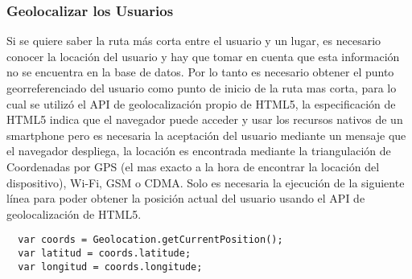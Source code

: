 

%
%
%



\subsubsection{Geolocalizar los Usuarios}
\label{sub:Manejo de Usuarios}

Si se quiere saber la ruta más corta entre el usuario y un lugar, es necesario conocer la locación del usuario y hay que tomar en cuenta que esta información no se encuentra en la base de datos. Por lo tanto es necesario obtener el punto georreferenciado del usuario como punto de inicio de la ruta mas corta, para lo cual se utilizó el API de geolocalización propio de HTML5, la especificación de HTML5 indica que el navegador puede acceder y usar los recursos nativos de un smartphone pero es necesaria la aceptación del usuario mediante un mensaje que el navegador despliega, la locación es encontrada mediante la triangulación de Coordenadas por GPS (el mas exacto a la hora de encontrar la locación del dispositivo), Wi-Fi, GSM o CDMA. Solo es necesaria la ejecución de la siguiente línea para poder obtener la posición actual del usuario usando el API de geolocalización de HTML5. \\

\begin{verbatim}
  var coords = Geolocation.getCurrentPosition();
  var latitud = coords.latitude;
  var longitud = coords.longitude;
\end{verbatim}

